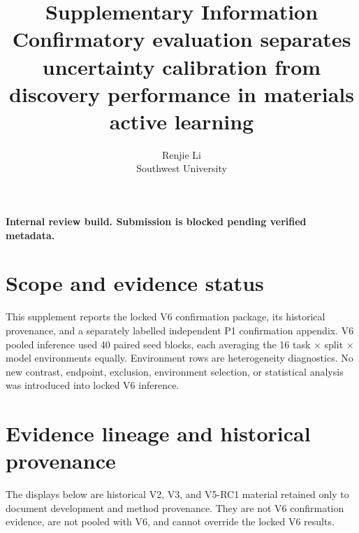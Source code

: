 \documentclass[10pt]{article}
\title{Supplementary Information\\[3pt]\large Confirmatory evaluation separates uncertainty calibration from discovery performance in materials active learning}
\author{Renjie Li\\[2pt]\normalsize Southwest University}
\date{}
\begin{document}
\maketitle
\begin{center}\small\textbf{Internal review build. Submission is blocked pending verified metadata.}\end{center}
\tableofcontents

\section{Scope and evidence status}
This supplement reports the locked V6 confirmation package, its historical
provenance, and a separately labelled independent P1 confirmation appendix.
V6 pooled inference used 40 paired seed blocks, each averaging the 16
task $\times$ split $\times$ model environments equally. Environment rows are
heterogeneity diagnostics. No new contrast, endpoint, exclusion, environment
selection, or statistical analysis was introduced into locked V6 inference.

\section{Evidence lineage and historical provenance}
The displays below are historical V2, V3, and V5-RC1 material retained only to document
development and method provenance. They are not V6 confirmation evidence, are
not pooled with V6, and cannot override the locked V6 results.
\end{document}
